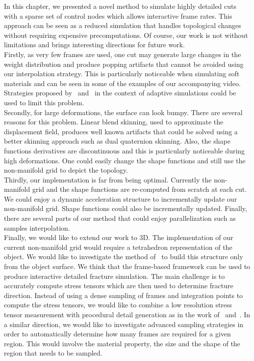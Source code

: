 In this chapter, we presented a novel method to simulate highly detailed cuts with a sparse set of control nodes which allows interactive frame rates. This approach can be seen as a reduced simulation that handles topological changes without requiring expensive precomputations. Of course, our work is not without limitations and brings interesting directions for future work.
\\
Firstly, as very few frames are used, one cut may generate large changes in the weight distribution and produce popping artifacts that cannot be avoided using our interpolation strategy. This is particularly noticeable when simulating soft materials and can be seen in some of the examples of our accompanying video. Strategies proposed by~\cite{Narain2013} and~\cite{Tournier2014} in the context of adaptive simulations could be used to limit this problem. 
\\
Secondly, for large deformations, the surface can look bumpy. There are several reasons for this problem. Linear blend skinning, used to approximate the displacement field, produces well known artifacts that could be solved using a better skinning approach such as dual quaternion skinning. Also, the shape functions derivatives are discontinuous and this is particularly noticeable during high deformations. One could easily change the shape functions and still use the non-manifold grid to depict the topology.
\\
Thirdly, our implementation is far from being optimal. Currently the non-manifold grid and the shape functions are re-computed from scratch at each cut. We could enjoy a dynamic acceleration structure to incrementally update our non-manifold grid. Shape functions could also be incrementally updated. Finally, there are several parts of our method that could enjoy parallelization such as samples interpolation.
\\
Finally, we would like to extend our work to 3D. The implementation of our current non-manifold grid would require a tetrahedron representation of the object. We would like to investigate the method of~\cite{Remillard2013} to build this structure only from the object surface. We think that the frame-based framework can be used to produce interactive detailed fracture simulation. The main challenge is to accurately compute stress tensors which are then used to determine fracture direction. Instead of using a dense sampling of frames and integration points to compute the stress tensors, we would like to combine a low resolution stress tensor measurement with procedural detail generation as in the work of~\cite{Chen2014} and~\cite{Lejemble2015}. In a similar direction, we would like to investigate advanced sampling strategies in order to automatically determine how many frames are required for a given region. This would involve the material property, the size and the shape of the region that needs to be sampled.
